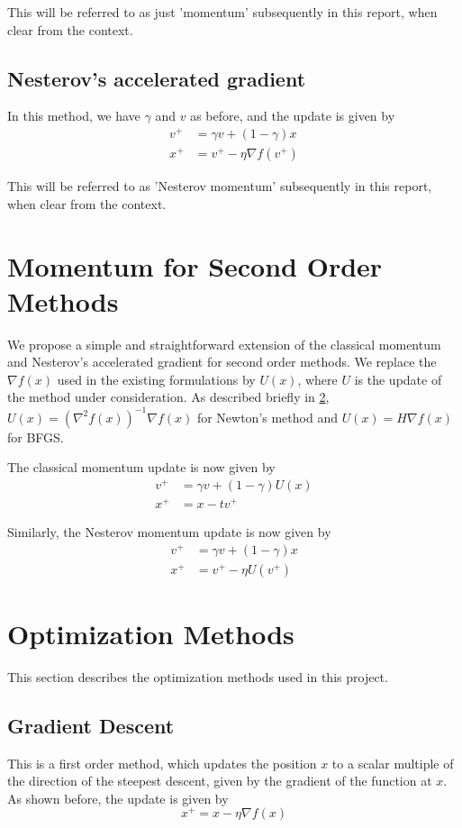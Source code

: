 \documentclass{article}
\begin{document}
This will be referred to as just 'momentum' subsequently in this report, when clear from the context.

\subsection{Nesterov's accelerated gradient}
In this method, we have $\gamma$ and $v$ as before, and the update is given by
\begin{align}
v^+ &= \gamma v + (1-\gamma)x \\
x^+ &= v^+ - \eta \nabla f(v^+)
\end{align}

This will be referred to as 'Nesterov momentum' subsequently in this report, when clear from the context.


\section{Momentum for Second Order Methods}\label{methodology}

We propose a simple and straightforward extension of the classical momentum and Nesterov's accelerated gradient for second order methods. We replace the $\nabla f(x)$ used in the existing formulations by $U(x)$, where $U$ is the update of the method under consideration. As described briefly in \ref{opt}, $U(x)=\left(\nabla^2 f(x) \right)^{-1}\nabla f(x)$ for Newton's method and $U(x)=H \nabla f(x)$ for BFGS.

The classical momentum update is now given by
\begin{align*}
v^{+} &= \gamma v + (1-\gamma) U(x) \\
x^{+} &= x - tv^{+}
\end{align*}

Similarly, the Nesterov momentum update is now given by
\begin{align}
v^+ &= \gamma v + (1-\gamma)x \\
x^+ &= v^+ - \eta U(v^+)
\end{align}

\section{Optimization Methods}\label{opt}
This section describes the optimization methods used in this project.

\subsection{Gradient Descent}
This is a first order method, which updates the position $x$ to a scalar multiple of the direction of the steepest descent, given by the gradient of the function at $x$. As shown before, the update is given by
\begin{equation}
x^+ = x - \eta \nabla f(x)
\end{equation}
\end{document}

